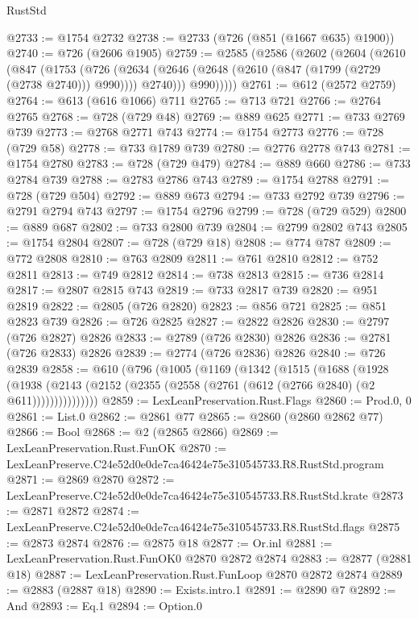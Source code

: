 \begin{lexlean}{RustStd}
\begin{coremodule}
@2733 := @1754 @2732
@2738 := @2733 (@726 (@851 (@1667 @635) @1900))
@2740 := @726 (@2606 @1905)
@2759 := @2585
    (@2586
      (@2602
        (@2604
          (@2610
            (@847
              (@1753
                (@726
                  (@2634 (@2646 (@2648 (@2610 (@847 (@1799 (@2729 (@2738 @2740))) @990)))) @2740)))
              @990)))))
@2761 := @612 (@2572 @2759)
@2764 := @613 (@616 @1066) @711
@2765 := @713 @721
@2766 := @2764 @2765
@2768 := @728 (@729 @48)
@2769 := @889 @625
@2771 := @733 @2769 @739
@2773 := @2768 @2771 @743
@2774 := @1754 @2773
@2776 := @728 (@729 @58)
@2778 := @733 @1789 @739
@2780 := @2776 @2778 @743
@2781 := @1754 @2780
@2783 := @728 (@729 @479)
@2784 := @889 @660
@2786 := @733 @2784 @739
@2788 := @2783 @2786 @743
@2789 := @1754 @2788
@2791 := @728 (@729 @504)
@2792 := @889 @673
@2794 := @733 @2792 @739
@2796 := @2791 @2794 @743
@2797 := @1754 @2796
@2799 := @728 (@729 @529)
@2800 := @889 @687
@2802 := @733 @2800 @739
@2804 := @2799 @2802 @743
@2805 := @1754 @2804
@2807 := @728 (@729 @18)
@2808 := @774 @787
@2809 := @772 @2808
@2810 := @763 @2809
@2811 := @761 @2810
@2812 := @752 @2811
@2813 := @749 @2812
@2814 := @738 @2813
@2815 := @736 @2814
@2817 := @2807 @2815 @743
@2819 := @733 @2817 @739
@2820 := @951 @2819
@2822 := @2805 (@726 @2820)
@2823 := @856 @721
@2825 := @851 @2823 @739
@2826 := @726 @2825
@2827 := @2822 @2826
@2830 := @2797 (@726 @2827) @2826
@2833 := @2789 (@726 @2830) @2826
@2836 := @2781 (@726 @2833) @2826
@2839 := @2774 (@726 @2836) @2826
@2840 := @726 @2839
@2858 := @610
    (@796
      (@1005
        (@1169
          (@1342
            (@1515
              (@1688
                (@1928
                  (@1938
                    (@2143 (@2152 (@2355 (@2558 (@2761 (@612 (@2766 @2840) (@2 @611)))))))))))))))
@2859 := LexLeanPreservation.Rust.Flags
@2860 := Prod.{0, 0}
@2861 := List.{0}
@2862 := @2861 @77
@2865 := @2860 (@2860 @2862 @77)
@2866 := Bool
@2868 := @2 (@2865 @2866)
@2869 := LexLeanPreservation.Rust.FunOK
@2870 := LexLeanPreserve.C24e52d0e0de7ca46424e75e310545733.R8.RustStd.program
@2871 := @2869 @2870
@2872 := LexLeanPreserve.C24e52d0e0de7ca46424e75e310545733.R8.RustStd.krate
@2873 := @2871 @2872
@2874 := LexLeanPreserve.C24e52d0e0de7ca46424e75e310545733.R8.RustStd.flags
@2875 := @2873 @2874
@2876 := @2875 @18
@2877 := Or.inl
@2881 := LexLeanPreservation.Rust.FunOK0 @2870 @2872 @2874
@2883 := @2877 (@2881 @18)
@2887 := LexLeanPreservation.Rust.FunLoop @2870 @2872 @2874
@2889 := @2883 (@2887 @18)
@2890 := Exists.intro.{1}
@2891 := @2890 @7
@2892 := And
@2893 := Eq.{1}
@2894 := Option.{0}

\end{coremodule}
\end{lexlean}
